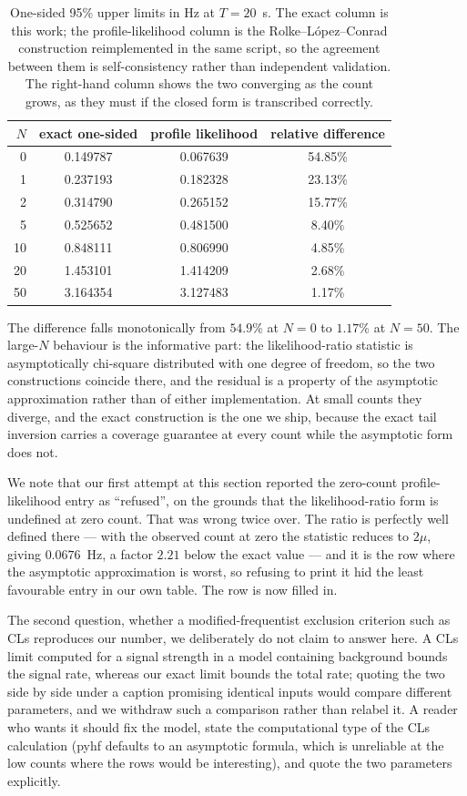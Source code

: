\documentclass[preprint,12pt]{elsarticle}
\begin{document}
\begin{table}[t]
\centering\small
\caption{One-sided 95\% upper limits in Hz at $T=20$~s.  The exact column is this
work; the profile-likelihood column is the Rolke--L\'opez--Conrad construction
reimplemented in the same script, so the agreement between them is
self-consistency rather than independent validation.  The right-hand column
shows the two converging as the count grows, as they must if the closed form is
transcribed correctly.}
\label{tab:tools}
\begin{tabular}{rccc}
\toprule
$N$ & exact one-sided & profile likelihood & relative difference \\
\midrule
0  & 0.149787 & 0.067639 & 54.85\% \\
1  & 0.237193 & 0.182328 & 23.13\% \\
2  & 0.314790 & 0.265152 & 15.77\% \\
5  & 0.525652 & 0.481500 & 8.40\% \\
10 & 0.848111 & 0.806990 & 4.85\% \\
20 & 1.453101 & 1.414209 & 2.68\% \\
50 & 3.164354 & 3.127483 & 1.17\% \\
\bottomrule
\end{tabular}
\end{table}

The difference falls monotonically from $54.9\%$ at $N=0$ to $1.17\%$ at $N=50$.
The large-$N$ behaviour is the informative part: the likelihood-ratio statistic
is asymptotically chi-square distributed with one degree of freedom, so the two
constructions coincide there, and the residual is a property of the asymptotic
approximation rather than of either implementation.  At small counts they
diverge, and the exact construction is the one we ship, because the exact tail
inversion carries a coverage guarantee at every count while the asymptotic form
does not.

We note that our first attempt at this section reported the zero-count
profile-likelihood entry as ``refused'', on the grounds that the
likelihood-ratio form is undefined at zero count.  That was wrong twice over.
The ratio is perfectly well defined there --- with the observed count at zero the
statistic reduces to $2\mu$, giving $0.0676$~Hz, a factor $2.21$ below the exact
value --- and it is the row where the asymptotic approximation is worst, so
refusing to print it hid the least favourable entry in our own table.  The row is
now filled in.

The second question, whether a modified-frequentist exclusion criterion such as
CLs reproduces our number, we deliberately do not claim to answer here.  A CLs
limit computed for a signal strength in a model containing background bounds the
signal rate, whereas our exact limit bounds the total rate; quoting the two side
by side under a caption promising identical inputs would compare different
parameters, and we withdraw such a comparison rather than relabel it.  A reader
who wants it should fix the model, state the computational type of the CLs
calculation (pyhf defaults to an asymptotic formula, which is unreliable at the
low counts where the rows would be interesting), and quote the two parameters
explicitly.
\end{document}

